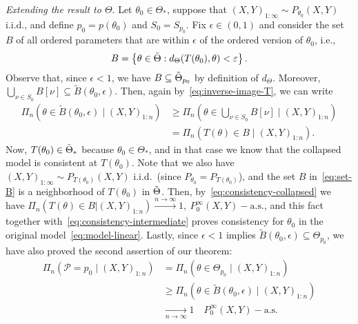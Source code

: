 \textit{Extending the result to \(\Theta\)}. Let \(\theta_0\in\Theta_*\), suppose that \((X,Y)_{1:\infty}\sim P_{\theta_0}(X, Y)\) i.i.d., and define \(p_0=p(\theta_0)\) and \(S_0 = S_{p_0}\). Fix \(\epsilon\in(0,1)\) and consider the set \(B\) of all ordered parameters that are within \(\epsilon\) of the ordered version of \(\theta_0\), i.e.,
\begin{equation}\label{eq:set-B}
  B = \left\{ \theta \in \tilde{\Theta}: d_\Theta(T(\theta_0), \theta) < \varepsilon \right\}.
\end{equation}
Observe that, since \(\epsilon < 1\), we have \(B\subseteq \tilde{\Theta}_{p_0}\) by definition of \(d_\Theta\). Moreover, \(\bigcup_{\nu\in S_{0}}B[\nu]\subseteq \tilde{B}(\theta_0, \epsilon)\). Then, again by~\eqref{eq:inverse-image-T}, we can write
\begin{equation}\label{eq:consistency-intermediate}
  \begin{aligned}
    \Pi_n(\theta \in \tilde{B}(\theta_0, \epsilon) \mid (X,Y)_{1:n}) & \geq \Pi_n(\theta \in \bigcup_{\nu\in S_{0}} B[\nu] \mid (X,Y)_{1:n}) \\
                                                                     & = \Pi_n(T(\theta) \in B \mid (X,Y)_{1:n}).
  \end{aligned}
\end{equation}
Now, \(T(\theta_0)\in{\tilde{\Theta}_*}\) because \(\theta_0\in\Theta_*\), and in that case we know that the collapsed model is consistent at \(T(\theta_0)\). Note that we also have \((X,Y)_{1:\infty} \sim P_{T(\theta_0)}(X, Y)\) i.i.d.\ (since \(P_{\theta_0}=P_{T(\theta_0)}\)), and the set \(B\) in~\eqref{eq:set-B} is a neighborhood of \(T(\theta_0)\) in \(\tilde{\Theta}\). Then, by~\eqref{eq:consistency-collapsed} we have \(\Pi_n(T(\theta) \in B | (X,Y)_{1:n}) \xrightarrow[]{n\to\infty} 1, \ P_0^\infty (X,Y)-\text{a.s.}\), and this fact together with~\eqref{eq:consistency-intermediate} proves consistency for \(\theta_0\) in the original model~\eqref{eq:model-linear}. Lastly, since \(\epsilon < 1\) implies \(\tilde{B}(\theta_0,\epsilon) \subseteq \Theta_{p_0}\), we have also proved the second assertion of our theorem:
\begin{align*}
  \Pi_n(\mathcal P=p_0\mid (X,Y)_{1:n}) & = \Pi_n(\theta \in \Theta_{p_0}\mid (X, Y)_{1:n})                                 \\
                                        & \geq \Pi_n(\theta \in\tilde{B}(\theta_0,\epsilon) \mid (X,Y)_{1:n})               \\
                                        & \xrightarrow[n\to\infty]{} 1 \quad P_0^\infty (X,Y)-\text{a.s.}\tag*{\(\square\)} %
\end{align*}

